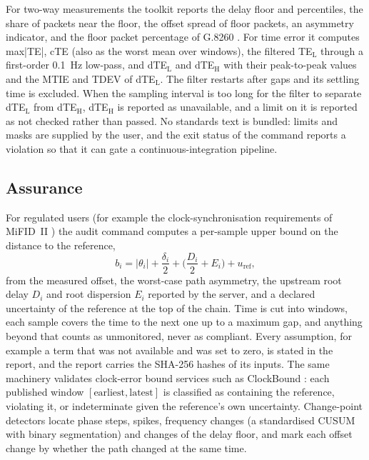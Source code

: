 \documentclass[11pt,a4paper]{article}
\begin{document}
For two-way measurements the toolkit reports the delay floor and percentiles, the share of packets near
the floor, the offset spread of floor packets, an asymmetry indicator, and the floor packet percentage
of G.8260 \citep{g8260}. For time error it computes max|TE|, cTE (also as the worst mean over windows),
the filtered TE$_\mathrm{L}$ through a first-order 0.1~Hz low-pass, and dTE$_\mathrm{L}$ and
dTE$_\mathrm{H}$ with their peak-to-peak values and the MTIE and TDEV of dTE$_\mathrm{L}$. The filter
restarts after gaps and its settling time is excluded. When the sampling interval is too long for the
filter to separate dTE$_\mathrm{L}$ from dTE$_\mathrm{H}$, dTE$_\mathrm{H}$ is reported as unavailable,
and a limit on it is reported as not checked rather than passed. No standards text is bundled: limits
and masks are supplied by the user, and the exit status of the command reports a violation so that it
can gate a continuous-integration pipeline.

\subsection{Assurance}

For regulated users (for example the clock-synchronisation requirements of MiFID~II \citep{mifid2017})
the audit command computes a per-sample upper bound on the distance to the reference,
\begin{equation}\label{eq:audit}
b_i = |\theta_i| + \frac{\delta_i}{2} + \Big(\frac{D_i}{2} + E_i\Big) + u_\mathrm{ref},
\end{equation}
from the measured offset, the worst-case path asymmetry, the upstream root delay $D_i$ and root
dispersion $E_i$ reported by the server, and a declared uncertainty of the reference at the top of the
chain. Time is cut into windows, each sample covers the time to the next one up to a maximum gap, and
anything beyond that counts as unmonitored, never as compliant. Every assumption, for example a term
that was not available and was set to zero, is stated in the report, and the report carries the
SHA-256 hashes of its inputs. The same machinery validates clock-error bound services such as
ClockBound \citep{clockbound}: each published window $[\text{earliest}, \text{latest}]$ is classified as
containing the reference, violating it, or indeterminate given the reference's own uncertainty.
Change-point detectors locate phase steps, spikes, frequency changes (a standardised CUSUM
\citep{page1954} with binary segmentation) and changes of the delay floor, and mark each offset change
by whether the path changed at the same time.
\end{document}
